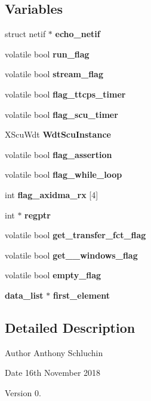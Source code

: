 \subsection*{Variables}
\begin{DoxyCompactItemize}
\item 
\mbox{\label{main_8c_acd12279932e5216593ee76d4eebdd996}} 
struct netif $\ast$ {\bfseries echo\+\_\+netif}
\item 
\mbox{\label{main_8c_a4d1709746b2e7d35d9bef7ee11f2c790}} 
volatile bool {\bfseries run\+\_\+flag}
\item 
\mbox{\label{main_8c_ac285664a88629c304befd42daafc3f90}} 
volatile bool {\bfseries stream\+\_\+flag}
\item 
\mbox{\label{main_8c_ae1142987fecfa0c02e7edfb9f539805b}} 
volatile bool {\bfseries flag\+\_\+ttcps\+\_\+timer}
\item 
\mbox{\label{main_8c_a92815e63a8bb041c9594c7229d49cd89}} 
volatile bool {\bfseries flag\+\_\+scu\+\_\+timer}
\item 
\mbox{\label{main_8c_afd1f6e74a3d4d317436684e7fa64a8fa}} 
X\+Scu\+Wdt {\bfseries Wdt\+Scu\+Instance}
\item 
\mbox{\label{main_8c_af9ff4df27689ce692fdfe44a8efec098}} 
volatile bool {\bfseries flag\+\_\+assertion}
\item 
\mbox{\label{main_8c_a68bc1b11e54681f4601358507aa9a3ad}} 
volatile bool {\bfseries flag\+\_\+while\+\_\+loop}
\item 
\mbox{\label{main_8c_a7ab3cdc6684119650796bf71c8c37b81}} 
int {\bfseries flag\+\_\+axidma\+\_\+rx} [4]
\item 
\mbox{\label{main_8c_a39d2cad95814eb9635cca5310d914893}} 
int $\ast$ {\bfseries regptr}
\item 
\mbox{\label{main_8c_af98df565a37a3db3fcafb5e66e062316}} 
volatile bool {\bfseries get\+\_\+transfer\+\_\+fct\+\_\+flag}
\item 
\mbox{\label{main_8c_ac3a118de77182fc96c16057fb7f75ec1}} 
volatile bool {\bfseries get\+\_\+\_\+windows\+\_\+flag}
\item 
\mbox{\label{main_8c_ad53968991c134c5dbfc1d0d83e5decdb}} 
volatile bool {\bfseries empty\+\_\+flag}
\item 
\mbox{\label{main_8c_a94f01ed55f54f902dc738539df30427e}} 
\textbf{ data\+\_\+list} $\ast$ {\bfseries first\+\_\+element}
\end{DoxyCompactItemize}


\subsection{Detailed Description}
\begin{DoxyAuthor}{Author}
Anthony Schluchin 
\end{DoxyAuthor}
\begin{DoxyDate}{Date}
16th November 2018 
\end{DoxyDate}
\begin{DoxyVersion}{Version}
0. 
\end{DoxyVersion}
